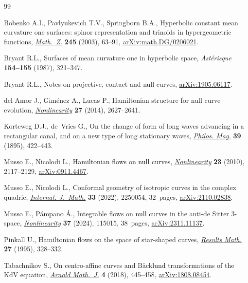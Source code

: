 \begin{thebibliography}{99}
\footnotesize\itemsep=0pt

Bobenko A.I., Pavlyukevich T.V., Springborn B.A., Hyperbolic constant mean
  curvature one surfaces: spinor representation and trinoids in hypergeometric
  functions, \href{https://doi.org/10.1007/s00209-003-0511-5}{\textit{Math.~Z.}} \textbf{245} (2003), 63--91,
  \href{https://arxiv.org/abs/math.DG/0206021}{arXiv:math.DG/0206021}.

Bryant R.L., Surfaces of mean curvature one in hyperbolic space,
  \textit{Ast\'erisque} \textbf{154--155} (1987), 321--347.

Bryant R.L., Notes on projective, contact and null curves, \href{https://arxiv.org/abs/1905.06117}{arXiv:1905.06117}.

del Amor J., Gim\'enez A., Lucas P., Hamiltonian structure for null curve
  evolution, \href{https://doi.org/10.1088/0951-7715/27/11/2627}{\textit{Nonlinearity}} \textbf{27} (2014), 2627--2641.

Korteweg D.J., de~Vries G., On the change of form of long waves advancing in a
  rectangular canal, and on a new type of long stationary waves,
  \href{https://doi.org/10.1080/14786449508620739}{\textit{Philos. Mag.}} \textbf{39} (1895), 422--443.

Musso E., Nicolodi L., Hamiltonian flows on null curves, \href{https://doi.org/10.1088/0951-7715/23/9/005}{\textit{Nonlinearity}}
  \textbf{23} (2010), 2117--2129, \href{https://arxiv.org/abs/0911.4467}{arXiv:0911.4467}.

Musso E., Nicolodi L., Conformal geometry of isotropic curves in the complex
  quadric, \href{https://doi.org/10.1142/S0129167X22500549}{\textit{Internat. J.~Math.}} \textbf{33} (2022), 2250054, 32~pages,
  \href{https://arxiv.org/abs/2110.02838}{arXiv:2110.02838}.

Musso E., P\'ampano {\'A}., Integrable flows on null curves in the anti-de
  {S}itter 3-space, \href{https://doi.org/10.1088/1361-6544/ad7d58}{\textit{Nonlinearity}} \textbf{37} (2024), 115015, 38~pages,
  \href{https://arxiv.org/abs/2311.11137}{arXiv:2311.11137}.

Pinkall U., Hamiltonian flows on the space of star-shaped curves,
  \href{https://doi.org/10.1007/BF03322836}{\textit{Results Math.}} \textbf{27} (1995), 328--332.

Tabachnikov S., On centro-affine curves and {B}\"acklund transformations of the
  {K}d{V} equation, \href{https://doi.org/10.1007/s40598-019-00105-y}{\textit{Arnold Math.~J.}} \textbf{4} (2018), 445--458,
  \href{https://arxiv.org/abs/1808.08454}{arXiv:1808.08454}.


\end{thebibliography}
